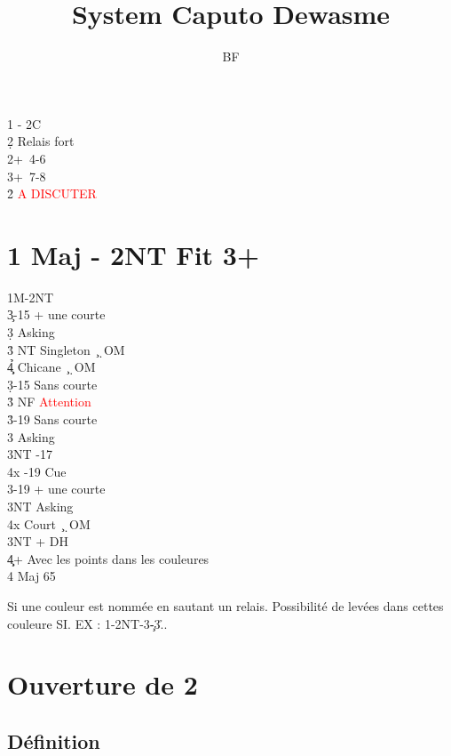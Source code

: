 \documentclass[a4paper]{article}
\title{System Caputo Dewasme}
\author{BF}
\begin{document}
\maketitle
\tableofcontents

\begin{bidtable}
1\s \> - 2C\+\\
2\d \> Relais fort\+\\
2\s {}+\s\ 4-6\\
3\s {}+\s\ 7-8\-\\
2\h \> \textcolor{red}{A DISCUTER}\-
\end{bidtable}

\section{1 Maj - 2NT Fit 3+}

\begin{bidtable}
1M-2NT\+\\
3\c {}-15 + une courte\+\\
3\d \> Asking\+\\
3\h\s \> NT Singleton \c\ \d\ OM\\
4\c\d\h \> Chicane  \c\ \d\ OM\-\-\\
3\d {}-15 Sans courte\+\\
3\h \> NF \textcolor{red}{Attention}\-\\
3\h {}-19 Sans courte\+\\
3\s \> Asking\+\\
3NT -17\\
4x -19 Cue\-\-\\
3\s {}-19 + une courte\+\\
3NT \> Asking\\
\>4x Court \c\ \d\ OM\-\\
3NT + DH\\
4\c\d {}+ Avec les points dans les couleures\\
4 \> Maj 65\-
\end{bidtable}

Si une couleur est nommée en sautant un relais. Possibilité de levées dans cettes couleure SI.
EX : 1\s -2NT-3\c -3\h ..

\section{Ouverture de 2\pdfc}

\subsection{Définition}
\end{document}
